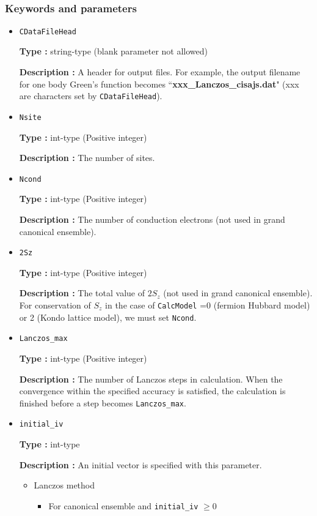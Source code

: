 ~\subsubsection{Keywords and parameters}
 \begin{itemize}
  \item  \verb|CDataFileHead|

 {\bf Type :} string-type (blank parameter not allowed)

{\bf Description :} A header for output files. For example, the output filename for one body Green's function becomes ``{\bf xxx\_Lanczos\_cisajs.dat}" (xxx are characters set by \verb|CDataFileHead|). 
   
 \item  \verb|Nsite|

{\bf Type :} int-type (Positive integer)

{\bf Description :} The number of sites.  


 \item  \verb|Ncond|

{\bf Type :} {int-type (Positive integer)}

{\bf Description :} {The number of conduction electrons (not used in grand canonical ensemble). }

 \item  \verb|2Sz|

{\bf Type :} {int-type (Positive integer)}

{\bf Description :} {The total value of $2S_z$ (not used in grand canonical ensemble). For conservation of $S_z$ in the case of } \verb|CalcModel| 
 { =0 (fermion Hubbard model) or 2 (Kondo lattice model), we must set} \verb|Ncond|.

 \item  \verb|Lanczos_max|

{\bf Type :} int-type (Positive integer)

{\bf Description :}  The number of Lanczos steps in calculation. When the convergence within the specified accuracy is satisfied, the calculation is finished before a step becomes  \verb|Lanczos_max|.

 \item  \verb|initial_iv|

{\bf Type :} int-type

{\bf Description :} 
{An initial vector is specified with this parameter.}
\begin{itemize}
\item{Lanczos method}
\begin{itemize}
\item{For canonical ensemble and \verb|initial_iv| $\geq 0$}


\end{itemize}
\end{itemize}
\end{itemize}
